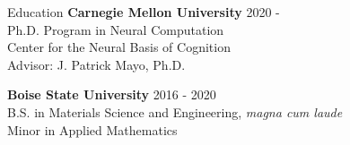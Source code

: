 \documentclass{resume} %
\begin{document}

\begin{rSection}{Education}
{\bf Carnegie Mellon University} \hfill {2020 -} \\ 
Ph.D. Program in Neural Computation \\
Center for the Neural Basis of Cognition \\
Advisor: J. Patrick Mayo, Ph.D. \smallskip 

{\bf Boise State University} \hfill {2016 - 2020} \\ 
B.S. in Materials Science and Engineering, \textit{magna cum laude} \\
Minor in Applied Mathematics \smallskip

\end{rSection}

\end{document}
